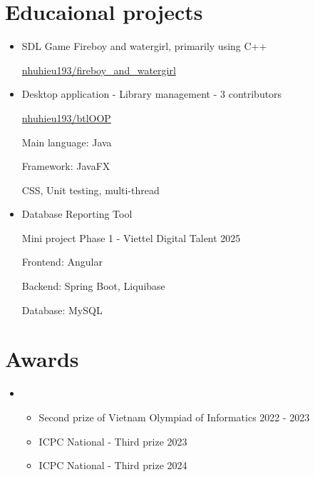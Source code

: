\documentclass[letterpaper,11pt]{article}
\newcommand{\cvitem}[1]{
  \item\small{
    {#1\vspace{-2pt}}
  }
}
\newcommand{\cvheadingstart}{\begin{itemize}[leftmargin=0in, label={}]}
\newcommand{\cvheadingend}{\end{itemize}}
\newcommand{\cvitemstart}{\begin{itemize}\justifying}
\newcommand{\cvitemend}{\end{itemize}\vspace{-5pt}}
\begin{document}
\section{Educaional projects}
\cvitemstart
    \cvitem {SDL Game Fireboy and watergirl, primarily using C++\hfill}
    \href{https://github.com/nhuhieu193/fireboy_and_watergirl}{nhuhieu193/fireboy\_and\_watergirl}
    \cvitem {Desktop application - Library management - 3 contributors\hfill}
    \href{https://github.com/nhuhieu193/btlOOP}{nhuhieu193/btlOOP}

    Main language: Java
    
    Framework: JavaFX

    CSS, Unit testing, multi-thread

    \cvitem {Database Reporting Tool\hfill}
    
    Mini project Phase 1 - Viettel Digital Talent 2025

    Frontend: Angular

    Backend: Spring Boot, Liquibase

    Database: MySQL
    
\cvitemend

\section{Awards}
\cvheadingstart
\item
\cvitemstart
  \cvitem{Second prize of Vietnam Olympiad of Informatics\hfill}{2022 - 2023}
  \cvitem{ICPC National - Third prize \hfill}{2023}
  \cvitem{ICPC National - Third prize \hfill}{2024}
\cvitemend
\cvheadingend
\end{document}
